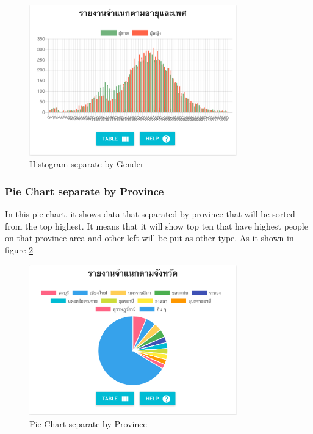     	\FloatBarrier
        	\begin{figure}[h!]
                \centering
            		\includegraphics[width=9cm]{images/chapter-05/graph-age-sex.png}
            		\caption{Histogram separate by Gender}
            		\label{graph-age-sex}
            \end{figure}
    	\FloatBarrier
    	
    	\subsubsection{Pie Chart separate by Province}
            In this pie chart, it shows data that separated by province that will be sorted from the top highest. It means that it will show top ten that have highest people on that province area and other left will be put as other type. As it shown in figure \ref{pie-graph-province}
	
    	\FloatBarrier
        	\begin{figure}[h!]
                \centering
            		\includegraphics[width=9cm]{images/chapter-05/pie-graph-province.png}
            		\caption{Pie Chart separate by Province}
            		\label{pie-graph-province}
            \end{figure}
    	\FloatBarrier
    	
